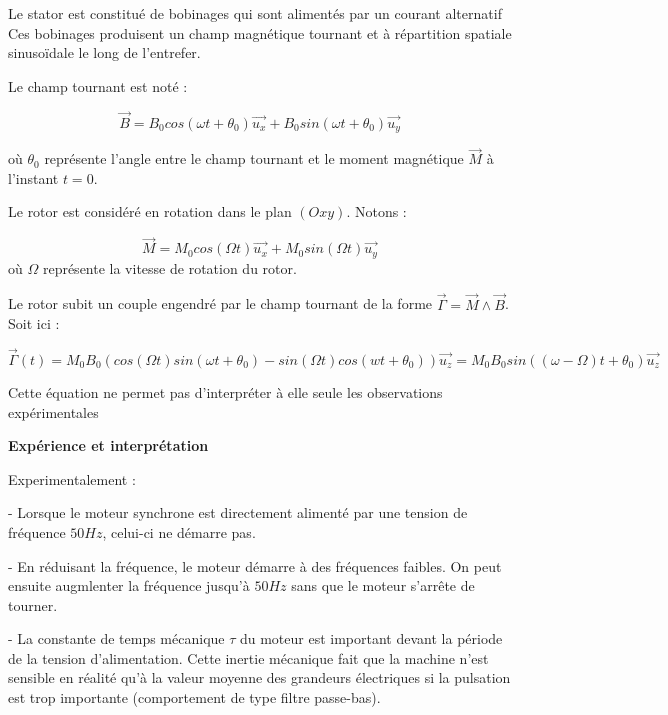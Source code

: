 \documentclass{article}
\begin{document}
Le stator est constitué de bobinages qui sont alimentés par un courant alternatif Ces bobinages produisent un champ magnétique tournant et à répartition spatiale sinusoïdale le long de l'entrefer.\medskip

Le champ tournant est noté :

\begin{equation}
    \vec{B} = B_0 cos(\omega t + \theta_0)\vec{u_x} + B_0 sin(\omega t + \theta_0)\vec{u_y}
\end{equation}

où $\theta_0$ représente l'angle entre le champ tournant et le moment magnétique $\vec{M}$ à l'instant $t=0$.\medskip

Le rotor est considéré en rotation dans le plan $(Oxy)$. Notons :

\begin{equation}
    \vec{M} = M_0 cos(\Omega t) \vec{u_x} + M_0sin(\Omega t )\vec{u_y}
\end{equation}
où $\Omega$ représente la vitesse de rotation du rotor.\medskip

Le rotor subit un couple engendré par le champ tournant de la forme $\vec{\Gamma} = \vec{M} \land \vec{B}$. Soit ici :

\begin{equation}
    \vec{\Gamma} (t) = M_0 B_0 (cos(\Omega t)sin(\omega t + \theta_0) - sin(\Omega t)cos(wt+\theta_0)) \vec{u_z} = M_0 B_0 sin ((\omega - \Omega)t + \theta_0) \vec{u_z}
\end{equation}

Cette équation ne permet pas d'interpréter à elle seule les observations expérimentales

\textbf{Expérience et interprétation}\medskip

Experimentalement :\medskip

- Lorsque le moteur synchrone est directement alimenté par une tension de fréquence $50 Hz$, celui-ci ne démarre pas.\medskip

- En réduisant la fréquence, le moteur démarre à des fréquences faibles. On peut ensuite augmlenter la fréquence jusqu'à $50 Hz$ sans que le moteur s'arrête de tourner.\medskip

- La constante de temps mécanique $\tau$ du moteur est important devant la période de la tension d'alimentation. Cette inertie mécanique fait que la machine n'est sensible en réalité qu'à la valeur moyenne des grandeurs électriques si la pulsation est trop importante (comportement de type filtre passe-bas).\medskip
\end{document}
